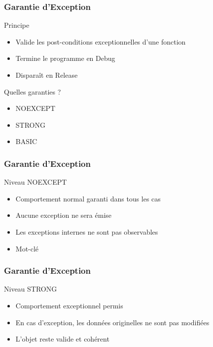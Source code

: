 \documentclass[svgnames]{beamer}
\begin{document}
\frame
{
  \frametitle{Garantie d'Exception}
  \begin{block}{Principe}
  \begin{itemize}
  \item Valide les \alert{post-conditions exceptionnelles} d'une fonction
  \item Termine le programme en Debug
  \item Disparaît en Release
  \end{itemize}
  \end{block}

  \begin{block}{Quelles garanties ?}
  \begin{itemize}
  \item NOEXCEPT
  \item STRONG
  \item BASIC
  \end{itemize}
  \end{block}
}


\frame
{
  \frametitle{Garantie d'Exception}
  \begin{block}{Niveau NOEXCEPT}
  \begin{itemize}
  \item Comportement normal garanti dans tous les cas
  \item Aucune exception ne sera émise
  \item Les exceptions internes ne sont pas observables
  \item Mot-clé 
  \end{itemize}
  \end{block}

  \begin{overlayarea}{\textwidth}{3cm}
  \end{overlayarea}
}

\frame
{
  \frametitle{Garantie d'Exception}
  \begin{block}{Niveau STRONG}
  \begin{itemize}
  \item Comportement exceptionnel permis
  \item En cas d'exception, les données originelles ne sont pas modifiées
  \item L'objet reste valide et cohérent
  \end{itemize}
  \end{block}
}
\end{document}
